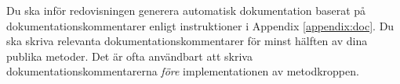 Du ska inför redovisningen generera automatisk dokumentation baserat på dokumentationskommentarer enligt instruktioner i Appendix \ref{appendix:doc}. Du ska skriva relevanta dokumentationskommentarer för minst hälften av dina publika metoder. Det är ofta användbart att skriva dokumentationskommentarerna \emph{före} implementationen av metodkroppen.